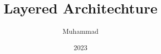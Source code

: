 \documentclass[a4paper,12pt]{book}
\begin{document}
	\title{Layered Architechture}
	\author{Muhammad}
	\date{2023}
	\maketitle
\end{document}
